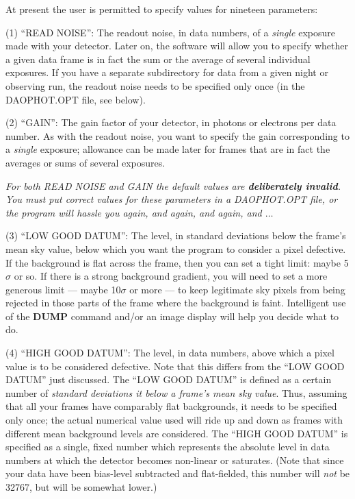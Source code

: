 At present the user is permitted to specify values for nineteen
parameters:

\item{(1)}  ``READ NOISE'':  The readout noise, in data numbers, of a
{\it single\/} exposure made with your detector.  Later on, the
software will allow you to specify whether a given data frame is in
fact the sum or the average of several individual exposures.  If you
have a separate subdirectory for data from a given night or observing
run, the readout noise needs to be specified only once (in the
DAOPHOT.OPT file, see below).

\item{(2)}  ``GAIN'':  The gain factor of your detector, in photons or
electrons per data number.  As with the readout noise, you want to
specify the gain corresponding to a {\it single\/} exposure; allowance
can be made later for frames that are in fact the averages or sums of
several exposures.

\item{}  {\it For both READ NOISE and GAIN the default values are
{\bf deliberately invalid}.  You must put correct values for these
parameters in a DAOPHOT.OPT file, or the program will hassle you
again, and again, and again, and $\ldots$}

\item{(3)}  ``LOW GOOD DATUM'':  The level, in standard deviations
below the frame's mean sky value, below which you want the program to
consider a pixel defective.  If the background is flat across the
frame, then you can set a tight limit:  maybe 5$\sigma$ or so.  If
there is a strong background gradient, you will need to set a more
generous limit --- maybe 10$\sigma$ or more --- to keep legitimate sky
pixels from being rejected in those parts of the frame where the
background is faint.  Intelligent use of the {\bf DUMP} command and/or
an image display will help you decide what to do.

\item{(4)}  ``HIGH GOOD DATUM'':  The level, in data numbers, above
which a pixel value is to be considered defective.  Note that this
differs from the ``LOW GOOD DATUM'' just discussed.  The ``LOW GOOD
DATUM'' is defined as a certain number of {\it standard deviations it
below a frame's mean sky value\/}. Thus, assuming that all your frames
have comparably flat backgrounds, it needs to be specified only once;
the actual numerical value used will ride up and down as frames with
different mean background levels are considered.  The ``HIGH GOOD
DATUM'' is specified as a single, fixed number which represents the
absolute level in data numbers at which the detector becomes non-linear
or saturates.  (Note that since your data have been bias-level
subtracted and flat-fielded, this number will {\it not\/} be 32767, but
will be somewhat lower.)

